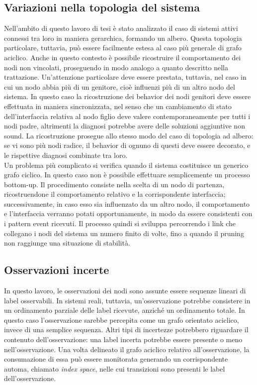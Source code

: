 \subsection{Variazioni nella topologia del sistema}
Nell'ambito di questo lavoro di tesi è stato analizzato il caso di sistemi attivi connessi tra loro in maniera gerarchica, formando un albero. Questa topologia particolare, tuttavia, può essere facilmente estesa al caso più generale di grafo aciclico. Anche in questo contesto è possibile ricostruire il comportamento dei nodi non vincolati, proseguendo in modo analogo a quanto descritto nella trattazione. Un'attenzione particolare deve essere prestata, tuttavia, nel caso in cui un nodo abbia più di un genitore, cioè influenzi più di un altro nodo del sistema. In questo caso la ricostruzione dei behavior dei nodi genitori deve essere effettuata in maniera sincronizzata, nel senso che un cambiamento di stato dell'interfaccia relativa al nodo figlio deve valere contemporaneamente  per tutti i nodi padre, altrimenti la diagnosi potrebbe avere delle soluzioni aggiuntive non sound. La ricostruzione prosegue allo stesso modo del caso di topologia ad albero: se vi sono più nodi radice, il behavior di ognuno di questi deve essere decorato, e le rispettive diagnosi combinate tra loro.\\
Un problema più complicato si verifica quando il sistema costituisce un generico grafo ciclico. In questo caso non è possibile effettuare semplicemente un processo bottom-up. Il procedimento consiste nella scelta di un nodo di partenza, ricostruendone il comportamento relativo e la corrispondente interfaccia; successivamente, in caso esso sia influenzato da un altro nodo, il comportamento e l'interfaccia verranno potati opportunamente, in modo da essere consistenti con i pattern event ricevuti. Il processo quindi si sviluppa percorrendo i link che collegano i nodi del sistema un numero finito di volte, fino a quando il pruning non raggiunge una situazione di stabilità. 

\subsection{Osservazioni incerte}
In questo lavoro, le osservazioni dei nodi sono assunte essere sequenze lineari di label osservabili. In sistemi reali, tuttavia, un'osservazione potrebbe consistere in un ordinamento parziale delle label ricevute, anziché un ordinamento totale. In questo caso l'osservazione sarebbe percepita come un grafo orientato aciclico, invece di una semplice sequenza. Altri tipi di incertezze potrebbero riguardare il contenuto dell'osservazione: una label incerta potrebbe essere presente o meno nell'osservazione. Una volta delineato il grafo aciclico relativo all'osservazione, la consumazione di essa può essere monitorata generando un corrispondente automa, chiamato \emph{index space}\cite{book:lamp}, nelle cui transizioni sono presenti le label dell'osservazione.


